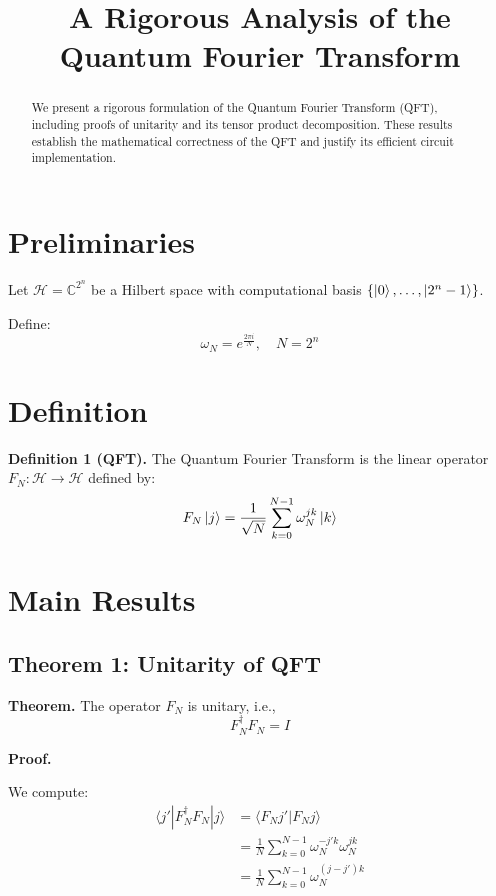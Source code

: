 \documentclass[conference]{article}
\title{A Rigorous Analysis of the Quantum Fourier Transform}
\begin{document}
\maketitle

\begin{abstract}
We present a rigorous formulation of the Quantum Fourier Transform (QFT), including proofs of unitarity and its tensor product decomposition. These results establish the mathematical correctness of the QFT and justify its efficient circuit implementation.
\end{abstract}

\section{Preliminaries}

Let $\mathcal{H} = \mathbb{C}^{2^n}$ be a Hilbert space with computational basis
$\{\ket{0}, \dots, \ket{2^n -1}\}$.

Define:
\begin{equation}
\omega_N = e^{\frac{2\pi i}{N}}, \quad N = 2^n
\end{equation}

\section{Definition}

\textbf{Definition 1 (QFT).}
The Quantum Fourier Transform is the linear operator
$F_N : \mathcal{H} \to \mathcal{H}$ defined by:
\begin{equation}
F_N \ket{j} = \frac{1}{\sqrt{N}} \sum_{k=0}^{N-1} \omega_N^{jk} \ket{k}
\end{equation}

\section{Main Results}

\subsection{Theorem 1: Unitarity of QFT}

\textbf{Theorem.}
The operator $F_N$ is unitary, i.e.,
\begin{equation}
F_N^\dagger F_N = I
\end{equation}

\textbf{Proof.}

We compute:
\begin{align}
\langle j' | F_N^\dagger F_N | j \rangle
&= \langle F_N j' | F_N j \rangle \\
&= \frac{1}{N} \sum_{k=0}^{N-1} \omega_N^{-j'k} \omega_N^{jk} \\
&= \frac{1}{N} \sum_{k=0}^{N-1} \omega_N^{(j - j')k}
\end{align}
\end{document}
